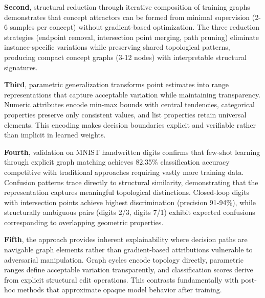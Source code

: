 \documentclass[a4paper,10pt]{article}
\begin{document}
\textbf{Second}, structural reduction through iterative composition of training graphs demonstrates that concept attractors can be formed from minimal supervision (2-6 samples per concept) without gradient-based optimization. The three reduction strategies (endpoint removal, intersection point merging, path pruning) eliminate instance-specific variations while preserving shared topological patterns, producing compact concept graphs (3-12 nodes) with interpretable structural signatures.

\textbf{Third}, parametric generalization transforms point estimates into range representations that capture acceptable variation while maintaining transparency. Numeric attributes encode min-max bounds with central tendencies, categorical properties preserve only consistent values, and list properties retain universal elements. This encoding makes decision boundaries explicit and verifiable rather than implicit in learned weights.

\textbf{Fourth}, validation on MNIST handwritten digits confirms that few-shot learning through explicit graph matching achieves 82.35\% classification accuracy competitive with traditional approaches requiring vastly more training data. Confusion patterns trace directly to structural similarity, demonstrating that the representation captures meaningful topological distinctions. Closed-loop digits with intersection points achieve highest discrimination (precision 91-94\%), while structurally ambiguous pairs (digits 2/3, digits 7/1) exhibit expected confusions corresponding to overlapping geometric properties.

\textbf{Fifth}, the approach provides inherent explainability where decision paths are navigable graph elements rather than gradient-based attributions vulnerable to adversarial manipulation. Graph cycles encode topology directly, parametric ranges define acceptable variation transparently, and classification scores derive from explicit structural edit operations. This contrasts fundamentally with post-hoc methods that approximate opaque model behavior after training.
\end{document}
